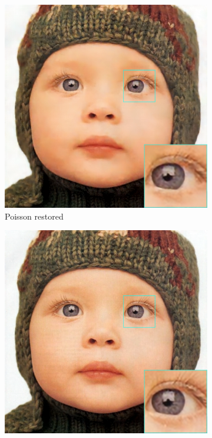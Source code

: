 \begin{figure}
\begin{subfigure}{0.24\textwidth}
		\includegraphics[width=\textwidth]{images/exp1.2/poisson.png}
		\caption{Poisson restored}
	\end{subfigure}
	\begin{subfigure}{0.24\textwidth}
		\includegraphics[width=\textwidth]{images/exp1.2/salt.png}

\end{subfigure}
\end{figure}
